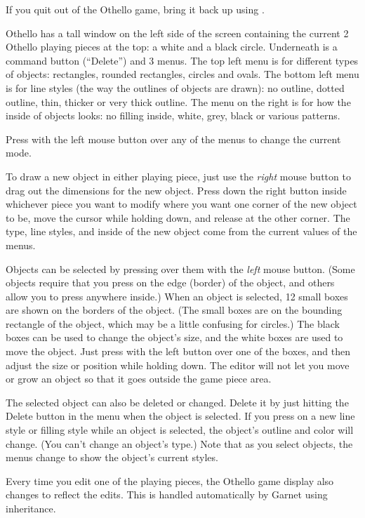 If you quit out of the Othello game, bring it back up using .

Othello has a tall window on the left side of the screen containing
the current 2 Othello playing  pieces at the top: a white
and a black circle.  Underneath is a command button (``Delete'') and 3
menus.  The top left menu is for different types of objects: rectangles,
rounded rectangles, circles and ovals.  The bottom left menu is for line
styles (the way the outlines of objects are drawn): no outline, dotted
outline, thin, thicker or very thick outline.  The menu on the right is for
how the inside of objects looks: no filling inside, white, grey, black or
various patterns.

Press with the left mouse button over any of the menus to change the
current mode.

To draw a new object in either playing
piece, just use the {\it right} mouse button
to drag out the dimensions for the new object.  Press down the right button
inside whichever piece you want to modify where you want one corner of the
new object to be, move the cursor while holding down, and
release at the other corner.  The type, line styles, and
inside of the new object come from the current values of the menus.

Objects can be selected by pressing over them with the {\it left} mouse
button.  (Some objects require that you press on the edge (border) of the
object, and others allow you to press anywhere inside.)
When an object is selected, 12 small boxes are shown on the borders of
the object.  (The small boxes are on the bounding rectangle of the object, which
may be a little confusing for circles.)
The black boxes can be used to change the object's size, and
the white boxes are used to move the object.  Just press with the left
button over one of the boxes, and then adjust the size or position while
holding down.  The editor will not let you move or grow an object so that
it goes outside the game piece area.

The selected object can also be deleted or changed.  Delete it by just
hitting the Delete button in the menu when the object is selected.  If you
press on a new line style or
filling style while an object is selected, the object's outline and color will
change.  (You can't change an object's type.)  Note that as you select
objects, the menus change to show the object's current styles.

Every time you edit one of the playing pieces, the Othello game display
also changes to reflect the edits.  This is handled automatically by Garnet
using inheritance.


